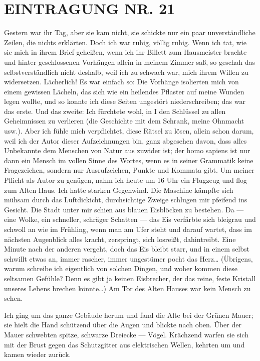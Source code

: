 \section{EINTRAGUNG NR. 21}

Gestern war ihr Tag, aber sie kam nicht, sie schickte nur ein paar
unverständliche Zeilen, die nichts erklärten. Doch ich war ruhig,
völlig ruhig. Wenn ich tat, wie sie mich in ihrem Brief geheißen,
wenn ich ihr Billett zum Hausmeister brachte und hinter
geschlossenen Vorhängen allein in meinem Zimmer saß, so geschah das
selbstverständlich nicht deshalb, weil ich zu schwach war, mich
ihrem Willen zu widersetzen. Lächerlich! Es war einfach so: Die
Vorhänge isolierten mich von einem gewissen Lächeln, das sich wie
ein heilendes Pflaster auf meine Wunden legen wollte, und so konnte
ich diese Seiten ungestört niederschreiben; das war das erste. Und
das zweite: Ich fürchtete wohl, in I den Schlüssel zu allen
Geheimnissen zu verlieren (die Geschichte mit dem Schrank, meine
Ohnmacht usw.). Aber ich fühle mich verpflichtet, diese Rätsel zu
lösen, allein schon darum, weil ich der Autor dieser Aufzeichnungen
bin, ganz abgesehen davon, dass alles Unbekannte dem Menschen von
Natur aus zuwider ist; der homo sapiens ist nur dann ein Mensch im
vollen Sinne des Wortes, wenn es in seiner Grammatik keine
Fragezeichen, sondern nur Ausrufzeichen, Punkte und Kommata gibt.
Um meiner Pflicht als Autor zu genügen, nahm ich heute um 16 Uhr
ein Flugzeug und flog zum Alten Haus. Ich hatte starken Gegenwind.
Die Maschine kämpfte sich mühsam durch das Luftdickicht,
durchsichtige Zweige schlugen mir pfeifend ins Gesicht. Die Stadt
unter mir schien aus blauen Eisblöcken zu bestehen. Da — eine
Wolke, ein schneller, schräger Schatten — das Eis verfärbte sich
bleigrau und schwoll an wie im Frühling, wenn man am Ufer steht und
darauf wartet, dass im nächsten Augenblick alles kracht,
zerspringt, sich losreißt, dahintreibt. Eine Minute nach der
anderen vergeht, doch das Eis bleibt starr, und in einem selbst
schwillt etwas an, immer rascher, immer ungestümer pocht das
Herz\ldots{} (Übrigens, warum schreibe ich eigentlich von solchen
Dingen, und woher kommen diese seltsamen Gefühle? Denn es gibt ja
keinen Eisbrecher, der das reine, feste Kristall unseres Lebens
brechen könnte\ldots{}) Am Tor des Alten Hauses war kein Mensch zu
sehen.

Ich ging um das ganze Gebäude herum und fand die Alte bei der
Grünen Mauer; sie hielt die Hand schützend über die Augen und
blickte nach oben. Über der Mauer schwebten spitze, schwarze
Dreiecke — Vögel. Krächzend warfen sie sich mit der Brust gegen das
Schutzgitter aus elektrischen Wellen, kehrten um und kamen wieder
zurück.

